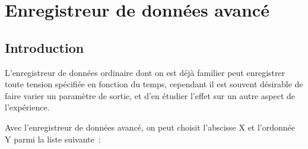 \documentclass[a4paper,12pt,french]{sphinxmanual}
\begin{document}
\section{Enregistreur de données avancé}
\label{\detokenize{7.3:enregistreur-de-donnees-avance}}\label{\detokenize{7.3::doc}}

\subsection{Introduction}
\label{\detokenize{7.3:introduction}}
L’enregistreur de données ordinaire dont on est déjà familier peut
enregistrer toute tension spécifiée en fonction du temps, cependant
il est souvent désirable de faire varier un paramètre de sortie, et d’en
étudier l’effet sur un autre aspect de l’expérience.

Avec l’enregistreur de données avancé, on peut choisit l’abscisse X et l’ordonnée Y parmi la liste suivante :
\end{document}

